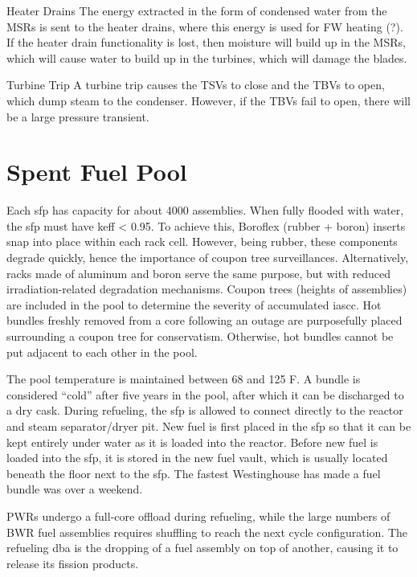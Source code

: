 \documentclass[10pt]{article}
\begin{document}
Heater Drains
The energy extracted in the form of condensed water from the MSRs is sent to the heater drains, where this energy is used for FW heating (?). If the heater drain functionality is lost, then moisture will build up in the MSRs, which will cause water to build up in the turbines, which will damage the blades. 

Turbine Trip
A turbine trip causes the TSVs to close and the TBVs to open, which dump steam to the condenser. However, if the TBVs fail to open, there will be a large pressure transient. 



\section{Spent Fuel Pool}

Each \gls{sfp} has capacity for about 4000 assemblies. When fully flooded with water, the \gls{sfp} must have keff < 0.95. To achieve this, Boroflex (rubber + boron) inserts snap into place within each rack cell. However, being rubber, these components degrade quickly, hence the importance of coupon tree surveillances. Alternatively, racks made of aluminum and boron serve the same purpose, but with reduced irradiation-related degradation mechanisms. Coupon trees (heights of assemblies) are included in the pool to determine the severity of accumulated \gls{iascc}. Hot bundles freshly removed from a core following an outage are purposefully placed surrounding a coupon tree for conservatism. Otherwise, hot bundles cannot be put adjacent to each other in the pool.

The pool temperature is maintained between 68 and 125 F. A bundle is considered ``cold'' after five years in the pool, after which it can be discharged to a dry cask. During refueling, the \gls{sfp} is allowed to connect directly to the reactor and steam separator/dryer pit. New fuel is first placed in the \gls{sfp} so that it can be kept entirely under water as it is loaded into the reactor.  Before new fuel is loaded into the \gls{sfp}, it is stored in the new fuel vault, which is usually located beneath the floor next to the \gls{sfp}. The fastest Westinghouse has made a fuel bundle was over a weekend. 

PWRs undergo a full-core offload during refueling, while the large numbers of BWR fuel assemblies requires shuffling to reach the next cycle configuration. The refueling \gls{dba} is the dropping of a fuel assembly on top of another, causing it to release its fission products. 
\end{document}
